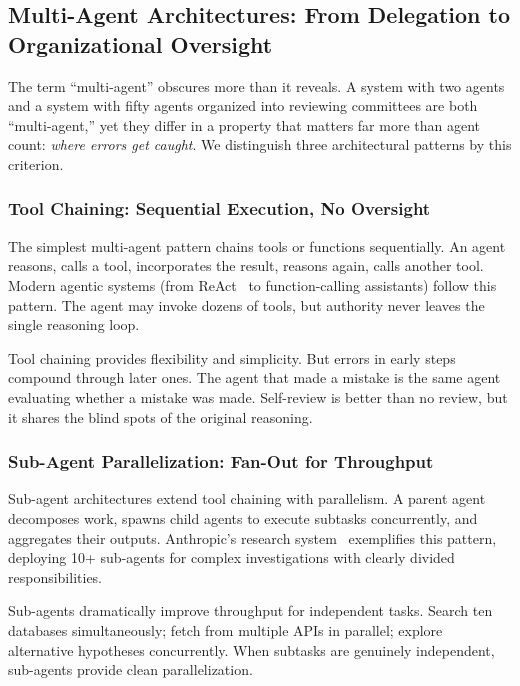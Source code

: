 \documentclass[sigconf]{acmart}
\newcommand{\reviewnote}[1]{}
\newcommand{\reviewnote}[1]{\marginnote{\raggedright\footnotesize\textit{#1}}}
\begin{document}
\subsection{Multi-Agent Architectures: From Delegation to Organizational Oversight}
\label{sec:multi-agent-comparison}

The term ``multi-agent'' obscures more than it reveals. A system with two agents and a system with fifty agents organized into reviewing committees are both ``multi-agent,'' yet they differ in a property that matters far more than agent count: \textit{where errors get caught}. We distinguish three architectural patterns by this criterion.

\subsubsection{Tool Chaining: Sequential Execution, No Oversight}

The simplest multi-agent pattern chains tools or functions sequentially. An agent reasons, calls a tool, incorporates the result, reasons again, calls another tool. Modern agentic systems (from ReAct~\cite{Yao2023ReAct} to function-calling assistants) follow this pattern. The agent may invoke dozens of tools, but authority never leaves the single reasoning loop.

Tool chaining provides flexibility and simplicity. But errors in early steps compound through later ones.\reviewnote{Evidence needed: cite or show error propagation rates from tool chaining systems. How much worse is cascading error?} The agent that made a mistake is the same agent evaluating whether a mistake was made. Self-review is better than no review, but it shares the blind spots of the original reasoning.

\subsubsection{Sub-Agent Parallelization: Fan-Out for Throughput}

Sub-agent architectures extend tool chaining with parallelism. A parent agent decomposes work, spawns child agents to execute subtasks concurrently, and aggregates their outputs. Anthropic's research system~\cite{Anthropic2025} exemplifies this pattern, deploying 10+ sub-agents for complex investigations with clearly divided responsibilities.

Sub-agents dramatically improve throughput for independent tasks. Search ten databases simultaneously; fetch from multiple APIs in parallel; explore alternative hypotheses concurrently. When subtasks are genuinely independent, sub-agents provide clean parallelization.
\end{document}
